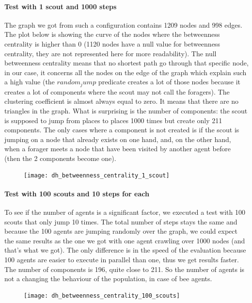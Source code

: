 \documentclass{article}
\begin{document}
		\paragraph{Test with 1 scout and 1000 steps}
			The graph we got from such a configuration contains 1209 nodes and 998 edges.
			The plot below is showing the curve of the nodes where the betweenness centrality is higher than 0
			(1120 nodes have a null value for betweenness centrality, they are not represented here for more readability).
			The null betweenness centrality means that no shortest path go through that specific node,
			in our case, it concerns all the nodes on the edge of the graph which explain such a high value
			(the $random_jump$ predicate creates a lot of those nodes because it creates a
			lot of components where the scout may not call the foragers).
			The clustering coefficient is almost always equal to zero.
			It means that there are no triangles in the graph.
			What is surprising is the number of components: the scout is supposed to jump from places to places 1000 times
			but create only 211 components.
			The only cases where a component is not created is if the scout is jumping on a node that already exists on one hand,
			and, on the other hand, when a forager meets a node that have been visited by another agent before
			(then the 2 components become one).
		\begin{figure}[!h]\hspace{2cm}
			\texttt{[image: dh\_betweenness\_centrality\_1\_scout]}
		\end{figure}
		\paragraph{Test with 100 scouts and 10 steps for each}
			To see if the number of agents is a significant factor, we executed a test with 100 scouts that only jump 10 times.
			The total number of steps stays the same and because the 100 agents are jumping randomly over the graph,
			we could expect the same results as the one we got with one agent crawling over 1000 nodes
			(and that's what we got).
			The only difference is in the speed of the evaluation because 100 agents are easier to execute in parallel than one,
			thus we get results faster.
			The number of components is 196, quite close to 211.
			So the number of agents is not a changing the behaviour of the population, in case of bee agents.
		\begin{figure}[!h]\hspace{2cm}
			\texttt{[image: dh\_betweenness\_centrality\_100\_scouts]}
		\end{figure}
\end{document}
